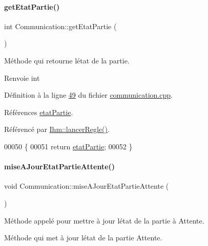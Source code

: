 \paragraph{\texorpdfstring{get\+Etat\+Partie()}{getEtatPartie()}}
{\footnotesize\ttfamily int Communication\+::get\+Etat\+Partie (\begin{DoxyParamCaption}{ }\end{DoxyParamCaption})}



Méthode qui retourne l\textquotesingle{}état de la partie. 

\begin{DoxyReturn}{Renvoie}
int 
\end{DoxyReturn}


Définition à la ligne \hyperlink{communication_8cpp_source_l00049}{49} du fichier \hyperlink{communication_8cpp_source}{communication.\+cpp}.



Références \hyperlink{communication_8h_source_l00100}{etat\+Partie}.



Référencé par \hyperlink{ihm_8cpp_source_l00623}{Ihm\+::lancer\+Regle()}.


\begin{DoxyCode}
00050 \{
00051     \textcolor{keywordflow}{return} \hyperlink{class_communication_a2539ded2780db2c732690c585c768c96}{etatPartie};
00052 \}
\end{DoxyCode}
\mbox{\label{class_communication_a72557be8ab858096e03f08e78e036aeb}} 
\paragraph{\texorpdfstring{mise\+A\+Jour\+Etat\+Partie\+Attente()}{miseAJourEtatPartieAttente()}}
{\footnotesize\ttfamily void Communication\+::mise\+A\+Jour\+Etat\+Partie\+Attente (\begin{DoxyParamCaption}{ }\end{DoxyParamCaption})}



Méthode appelé pour mettre à jour l\textquotesingle{}état de la partie à Attente. 

Méthode qui met à jour l\textquotesingle{}état de la partie Attente. 

